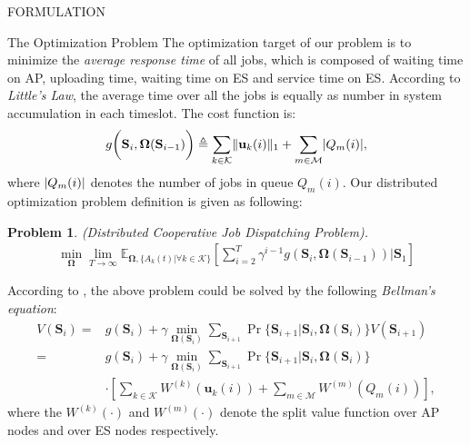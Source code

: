 \documentclass[10pt, conference, letterpaper]{IEEEtran}
\newtheorem{problem}{Problem}
\newcommand{\define}{\triangleq}
\renewcommand{\vec}{\mathbf}
\DeclarePairedDelimiter{\norm}{|}{|}
\DeclarePairedDelimiter{\Inorm}{\|}{\|_1}
\newcommand{\apSet}{\mathcal{K}}
\newcommand{\esSet}{\mathcal{M}}
\newcommand{\Stat}{\mathbf{S}}
\newcommand{\Policy}{\mathbf{\Omega}}
\begin{document}
\begin{section}{FORMULATION}
        \begin{subsection}{The Optimization Problem}
            The optimization target of our problem is to minimize the \emph{average response time} of all jobs, which is composed of waiting time on AP, uploading time, waiting time on ES and service time on ES. According to \emph{Little's Law}, the average time over all the jobs is equally as number in system accumulation in each timeslot. The cost function is:
            \begin{align}
                g \bigg( \Stat_{i}, \Policy(\Stat_{i-1}) \bigg) \define \sum_{k\in\apSet} \Inorm{\vec{u}_{k}(i)} + \sum_{m\in\esSet} \norm{Q_m(i)},
            \end{align}
            where $\norm{Q_m(i)}$ denotes the number of jobs in queue $Q_m(i)$.
            Our distributed optimization problem definition is given as following:
            \begin{problem}
                (Distributed Cooperative Job Dispatching Problem).
                \begin{gather}
                    \min_{\Policy} \lim_{T \to \infty}
                        \mathbb{E}_{\Policy, \{A_k(t)|\forall k\in\apSet\}}
                            [\sum_{i=2}^{T} \gamma^{i-1} g(\Stat_{i}, \Policy(\Stat_{i-1}))|\Stat_1]
                \end{gather}
            \end{problem}

            According to \cite{sutton1998introduction}, the above problem could be solved by the following \emph{Bellman's equation}:
            \begin{align}
                V(\Stat_{i}) =& g(\Stat_i) + \gamma \min_{\Policy(\Stat_{i})} \sum_{\Stat_{i+1}} \Pr\{ \Stat_{i+1}|\Stat_{i}, \Policy(\Stat_{i}) \} V(\Stat_{i+1})
                \nonumber\\
                =& g(\Stat_{i}) + \gamma \min_{\Policy(\Stat_{i})} \sum_{\Stat_{i+1}} \Pr\{ \Stat_{i+1}|\Stat_{i}, \Policy(\Stat_{i}) \}
                    \nonumber\\
                    & \cdot [\sum_{k\in\apSet} W^{(k)}(\vec{u}_k(i)) + \sum_{m\in\esSet} W^{(m)}(Q_m(i))],
            \end{align}
            where the  $W^{(k)}(\cdot)$ and $W^{(m)}(\cdot)$ denote the split value function over AP nodes and over ES nodes respectively.


\end{subsection}
\end{section}
\end{document}
